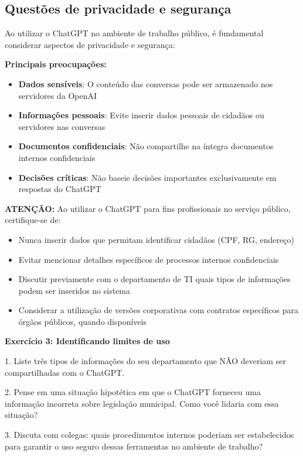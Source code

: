 \documentclass[12pt,a4paper]{book}
\begin{document}
\subsection{Questões de privacidade e segurança}

Ao utilizar o ChatGPT no ambiente de trabalho público, é fundamental considerar aspectos de privacidade e segurança:

\textbf{Principais preocupações:}
\begin{itemize}
    \item \textbf{Dados sensíveis}: O conteúdo das conversas pode ser armazenado nos servidores da OpenAI
    \item \textbf{Informações pessoais}: Evite inserir dados pessoais de cidadãos ou servidores nas conversas
    \item \textbf{Documentos confidenciais}: Não compartilhe na íntegra documentos internos confidenciais
    \item \textbf{Decisões críticas}: Não baseie decisões importantes exclusivamente em respostas do ChatGPT
\end{itemize}

\begin{tcolorbox}[atencao]
\textbf{ATENÇÃO:} Ao utilizar o ChatGPT para fins profissionais no serviço público, certifique-se de:
\begin{itemize}
    \item Nunca inserir dados que permitam identificar cidadãos (CPF, RG, endereço)
    \item Evitar mencionar detalhes específicos de processos internos confidenciais
    \item Discutir previamente com o departamento de TI quais tipos de informações podem ser inseridos no sistema
    \item Considerar a utilização de versões corporativas com contratos específicos para órgãos públicos, quando disponíveis
\end{itemize}
\end{tcolorbox}

\begin{tcolorbox}[pratica]
\textbf{Exercício 3: Identificando limites de uso}

1. Liste três tipos de informações do seu departamento que NÃO deveriam ser compartilhadas com o ChatGPT.

2. Pense em uma situação hipotética em que o ChatGPT forneceu uma informação incorreta sobre legislação municipal. Como você lidaria com essa situação?

3. Discuta com colegas: quais procedimentos internos poderiam ser estabelecidos para garantir o uso seguro dessas ferramentas no ambiente de trabalho?
\end{tcolorbox}
\end{document}
